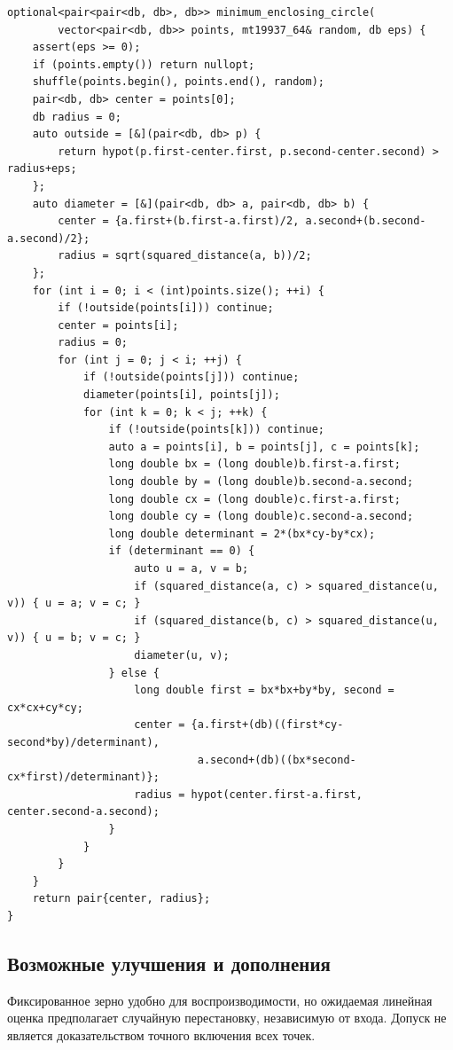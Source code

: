 \begin{lstlisting}[name=geometry_enclosing]
optional<pair<pair<db, db>, db>> minimum_enclosing_circle(
        vector<pair<db, db>> points, mt19937_64& random, db eps) {
    assert(eps >= 0);
    if (points.empty()) return nullopt;
    shuffle(points.begin(), points.end(), random);
    pair<db, db> center = points[0];
    db radius = 0;
    auto outside = [&](pair<db, db> p) {
        return hypot(p.first-center.first, p.second-center.second) > radius+eps;
    };
    auto diameter = [&](pair<db, db> a, pair<db, db> b) {
        center = {a.first+(b.first-a.first)/2, a.second+(b.second-a.second)/2};
        radius = sqrt(squared_distance(a, b))/2;
    };
    for (int i = 0; i < (int)points.size(); ++i) {
        if (!outside(points[i])) continue;
        center = points[i];
        radius = 0;
        for (int j = 0; j < i; ++j) {
            if (!outside(points[j])) continue;
            diameter(points[i], points[j]);
            for (int k = 0; k < j; ++k) {
                if (!outside(points[k])) continue;
                auto a = points[i], b = points[j], c = points[k];
                long double bx = (long double)b.first-a.first;
                long double by = (long double)b.second-a.second;
                long double cx = (long double)c.first-a.first;
                long double cy = (long double)c.second-a.second;
                long double determinant = 2*(bx*cy-by*cx);
                if (determinant == 0) {
                    auto u = a, v = b;
                    if (squared_distance(a, c) > squared_distance(u, v)) { u = a; v = c; }
                    if (squared_distance(b, c) > squared_distance(u, v)) { u = b; v = c; }
                    diameter(u, v);
                } else {
                    long double first = bx*bx+by*by, second = cx*cx+cy*cy;
                    center = {a.first+(db)((first*cy-second*by)/determinant),
                              a.second+(db)((bx*second-cx*first)/determinant)};
                    radius = hypot(center.first-a.first, center.second-a.second);
                }
            }
        }
    }
    return pair{center, radius};
}
\end{lstlisting}
\subsection*{Возможные улучшения и дополнения}
Фиксированное зерно удобно для воспроизводимости, но ожидаемая линейная
оценка предполагает случайную перестановку, независимую от входа.
Допуск не является доказательством точного включения всех точек.

\fi
